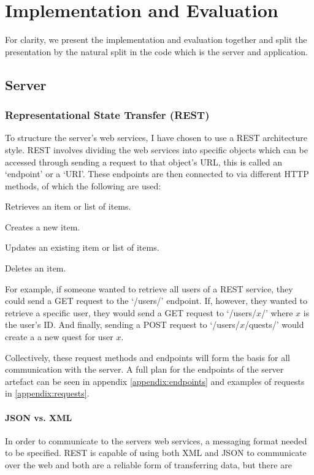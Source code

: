 \chapter{Implementation and Evaluation}

For clarity, we present the implementation and evaluation together and split the presentation by the natural split in the code which is the server and application.

\section{Server}
\subsection{Representational State Transfer (REST)}
To structure the server's web services, I have chosen to use a REST architecture style.
REST involves dividing the web services into specific objects which can be accessed through sending a request to that object's URL, this is called an `endpoint' or a `URI'.
These endpoints are then connected to via different HTTP methods, of which the following are used:
\begin{description}[align=left]
	\item [GET] Retrieves an item or list of items.
	\item [POST] Creates a new item.
	\item [PUT] Updates an existing item or list of items.
	\item [DELETE] Deletes an item.
\end{description}
For example, if someone wanted to retrieve all users of a REST service, they could send a GET request to the `/users/' endpoint. 
If, however, they wanted to retrieve a specific user, they would send a GET request to `/users/$x$/' where $x$ is the user's ID.
And finally, sending a POST request to `/users/$x$/quests/' would create a a new quest for user $x$.

Collectively, these request methods and endpoints will form the basis for all communication with the server. 
A full plan for the endpoints of the server artefact can be seen in appendix \ref{appendix:endpoints} and examples of requests in \ref{appendix:requests}.

\subsubsection{JSON vs. XML}
In order to communicate to the servers web services, a messaging format needed to be specified. 
REST is capable of using both XML and JSON to communicate over the web and both are a reliable form of transferring data, but there are 

